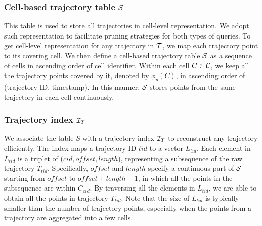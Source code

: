 \documentclass[10pt,conference,letterpaper]{IEEEtran}
\newcommand{\alltraj}{{{\cal T}}\xspace}
\newcommand{\allcell}{{\cal C}\xspace}
\newcommand{\trajtable}{{\cal S}\xspace}
\newcommand{\trajindex}{{{\cal I}_T}\xspace}
\begin{document}
\subsubsection{Cell-based trajectory table $\trajtable$}
This table is used to store all trajectories in cell-level representation. We adopt such representation to facilitate pruning strategies for both types of queries.
To get cell-level representation for any trajectory in $\alltraj$, we map each trajectory point to its covering cell.
We then define a cell-based trajectory table $\trajtable$ as a sequence of cells in ascending order of cell identifier.
Within each cell $C\in\allcell$, we keep all the trajectory points covered by it, denoted by $\phi_p(C)$, in ascending order of (trajectory ID, timestamp).
In this manner, $\trajtable$ stores points from the same trajectory in each cell continuously.



\subsubsection{Trajectory index $\trajindex$}
We associate the table $S$ with a trajectory index $\trajindex$ to reconstruct any trajectory efficiently. The index maps a trajectory ID $tid$ to a vector $L_{tid}$. Each element in $L_{tid}$ is a triplet of ($cid, offset, length$), representing a subsequence of the raw trajectory $T_{tid}$. Specifically, $offset$ and $length$ specify a continuous part of $\trajtable$ starting from $offset$ to $offset+length-1$, in which all the points in the subsequence are within $C_{cid}$. By traversing all the elements in $L_{tid}$, we are able to obtain all the points in trajectory $T_{tid}$. Note that the size of $L_{tid}$ is typically smaller than the number of trajectory points, especially when the points from a trajectory are aggregated into a few cells.
\end{document}
